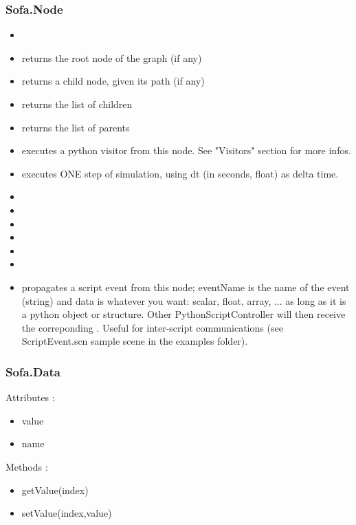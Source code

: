 \subsubsection{Sofa.Node}
\begin{itemize}
\item {} 
\item {} returns the root node of the graph (if any) 
\item {} returns a child node, given its path (if any) 
\item {} returns the list of children 
\item {} returns the list of parents
\item {} executes a python visitor from this node. See "Visitors" section for more infos.
\item {} executes ONE step of simulation, using dt (in seconds, float) as delta time. 
\item {} 
\item {} 
\item {} 
\item {} 
\item {} 
\item {} 
\item {} propagates a script event from this node; eventName is the name of the event (string) and data is whatever you want: scalar, float, array, ... as long as it is a python object or structure. Other PythonScriptController will then receive the correponding . Useful for inter-script communications (see ScriptEvent.scn sample scene in the examples folder).
\end{itemize}


\subsubsection{Sofa.Data}
Attributes :
\begin{itemize}
\item value
\item name
\end{itemize}
Methods :
\begin{itemize}
\item getValue(index)
\item setValue(index,value)
\end{itemize}

